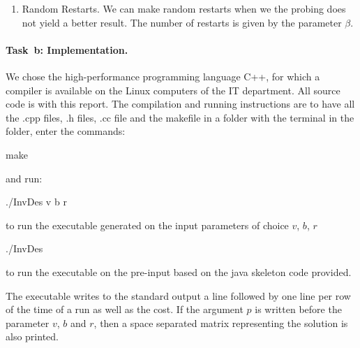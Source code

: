 \begin{enumerate}
\item Random Restarts. We can make random restarts when we the probing does not yield a better result. The number of restarts is given by the parameter $\beta$. 
\end{enumerate}

\paragraph{Task~b: Implementation.}
We chose the high-performance programming language C++, for
which a compiler is available on the Linux
computers of the IT department.  All source code is 
with this report.  The compilation and running instructions are
to have all the \textsf{.cpp} files, \textsf{.h} files, \textsf{.cc} file and the makefile in a folder with the terminal in the folder, enter the commands:
\begin{center}
\textsf{make}
\end{center}
and run:
\begin{center}
\textsf{./InvDes {v} {b} {r} }
\end{center}
to run the executable generated on the input parameters of choice $v$,  $b$,  $r$
\begin{center}
\textsf{./InvDes}
\end{center}
to run the executable on the pre-input based on the java skeleton code provided. 

The executable writes to the standard output a line  followed by one line per row of the time of a run as well as the cost. If the argument $p$ is written before the parameter $v$, $b$ and $r$, then a space separated matrix representing the solution is also printed. 

